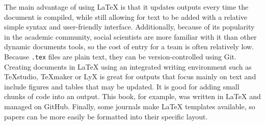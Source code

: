 The main advantage of using {\LaTeX} is that it updates outputs every time the document is compiled,
while still allowing for text to be added with a relative simple syntax and user-friendly interface.
Additionally, because of its popularity in the academic community,
social scientists are more familiar with it than other dynamic documents tools,
so the cost of entry for a team is often relatively low.
Because \texttt{.tex} files are plain text,
they can be version-controlled using Git.
Creating documents in {\LaTeX} using an integrated writing environment such as TeXstudio, TeXmaker or LyX
is great for outputs that focus mainly on text
and include figures and tables that may be updated.
It is good for adding small chunks of code into an output.
This book, for example, was written in {\LaTeX} and managed on GitHub.
Finally, some journals make {\LaTeX} templates available,
so papers can be more easily be formatted into their specific layout.



